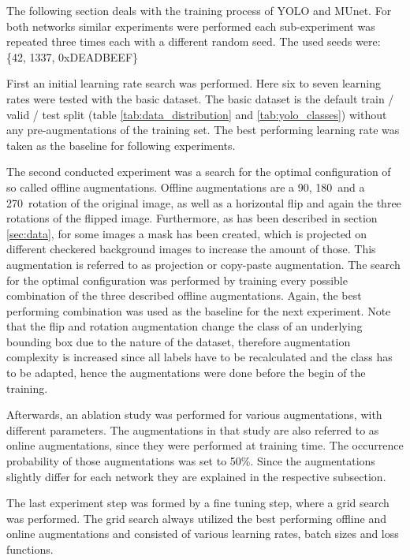 \label{sec:training}

The following section deals with the training process of YOLO and \ac{MUnet}.
For both networks similar experiments were performed each sub-experiment was repeated three times each with a different random seed.
The used seeds were: \{42, 1337, 0xDEADBEEF\}

First an initial learning rate search was performed.
Here six to seven learning rates were tested with the basic dataset.
The basic dataset is the default train / valid / test split (table \ref{tab:data_distribution} and \ref{tab:yolo_classes}) without any pre-augmentations of the training set.
The best performing learning rate was taken as the baseline for following experiments.

The second conducted experiment was a search for the optimal configuration of so called offline augmentations.
Offline augmentations are a 90\textdegree, 180\textdegree\ and a 270\textdegree\  rotation of the original image, as well as a horizontal flip and again the three rotations of the flipped image.
Furthermore, as has been described in section \ref{sec:data}, for some images a mask has been created, which is projected on different checkered background images to increase the amount of those.
This augmentation is referred to as projection or copy-paste augmentation.
The search for the optimal configuration was performed by training every possible combination of the three described offline augmentations.
Again, the best performing combination was used as the baseline for the next experiment.
Note that the flip and rotation augmentation change the class of an underlying bounding box due to the nature of the dataset, therefore augmentation complexity is increased since all labels have to be recalculated and the class has to be adapted, hence the augmentations were done before the begin of the training.

Afterwards, an ablation study was performed for various augmentations, with different parameters.
The augmentations in that study are also referred to as online augmentations, since they were performed at training time.
The occurrence probability of those augmentations was set to 50\%.
Since the augmentations slightly differ for each network they are explained in the respective subsection.

The last experiment step was formed by a fine tuning step, where a grid search was performed.
The grid search always utilized the best performing offline and online augmentations and consisted of various learning rates, batch sizes and loss functions.

